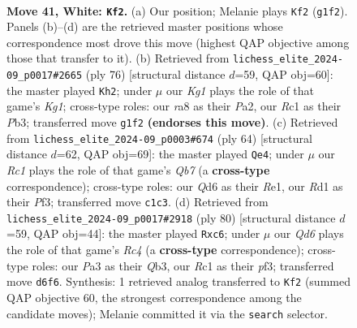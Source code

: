 \documentclass[11pt]{article}
\begin{document}
\clearpage

\begin{figure}[p]\centering
\begin{subfigure}{0.46\textwidth}\centering
\resizebox{\linewidth}{!}{%
\newchessgame
\chessboard[
  setfen={r5k1/pp6/n2Q4/2pP1p2/6q1/P5P1/1P6/2RR2K1 w - - 0 41},
  showmover=false,
  pgfstyle=straightmove, color=movearrow, markmove={g1-f2}
]}
\caption{}
\end{subfigure}\hfill
\begin{subfigure}{0.46\textwidth}\centering
\resizebox{\linewidth}{!}{%
\newchessgame
\chessboard[
  setfen={5r1k/7p/p4q2/4pP2/1p1pQ3/1P1P3P/P7/5RK1 w - - 3 39},
  showmover=false,
  pgfstyle=straightmove, color=movearrow, markmove={g1-h2}
]}
\caption{}
\end{subfigure}
\\[4pt]
\begin{subfigure}{0.46\textwidth}\centering
\resizebox{\linewidth}{!}{%
\newchessgame
\chessboard[
  setfen={5rk1/1Q4p1/3r4/2p5/P1Pp4/4qPp1/4P1K1/2R1R3 w - - 1 33},
  showmover=false,
  pgfstyle=straightmove, color=movearrow, markmove={b7-e4}
]}
\caption{}
\end{subfigure}\hfill
\begin{subfigure}{0.46\textwidth}\centering
\resizebox{\linewidth}{!}{%
\newchessgame
\chessboard[
  setfen={k7/p7/Ppp1p3/3n4/2RPq2r/1Q3p2/1P6/2R3K1 w - - 0 41},
  showmover=false,
  pgfstyle=straightmove, color=movearrow, markmove={c4-c6}
]}
\caption{}
\end{subfigure}
\caption{\textbf{Move 41, White: \texttt{Kf2}.} (a) Our position; Melanie plays \texttt{Kf2} (\texttt{g1f2}). Panels (b)--(d) are the retrieved master positions whose correspondence most drove this move (highest QAP objective among those that transfer to it). (b) Retrieved from \texttt{lichess\_elite\_2024-09\_p0017\#2665} (ply 76) [structural distance $d$=59, QAP obj=60]: the master played \texttt{Kh2}; under $\mu$ our \emph{Kg1} plays the role of that game's \emph{Kg1}; cross-type roles: our \emph{r}a8 as their \emph{P}a2, our \emph{R}c1 as their \emph{P}b3; transferred move \texttt{g1f2} \textbf{(endorses this move)}. (c) Retrieved from \texttt{lichess\_elite\_2024-09\_p0003\#674} (ply 64) [structural distance $d$=62, QAP obj=69]: the master played \texttt{Qe4}; under $\mu$ our \emph{Rc1} plays the role of that game's \emph{Qb7} (a \textbf{cross-type} correspondence); cross-type roles: our \emph{Q}d6 as their \emph{R}e1, our \emph{R}d1 as their \emph{P}f3; transferred move \texttt{c1c3}. (d) Retrieved from \texttt{lichess\_elite\_2024-09\_p0017\#2918} (ply 80) [structural distance $d$=59, QAP obj=44]: the master played \texttt{Rxc6}; under $\mu$ our \emph{Qd6} plays the role of that game's \emph{Rc4} (a \textbf{cross-type} correspondence); cross-type roles: our \emph{P}a3 as their \emph{Q}b3, our \emph{R}c1 as their \emph{p}f3; transferred move \texttt{d6f6}. Synthesis: 1 retrieved analog transferred to \texttt{Kf2} (summed QAP objective 60, the strongest correspondence among the candidate moves); Melanie committed it via the \texttt{search} selector.}
\label{fig:thought-m80}
\end{figure}
\end{document}
